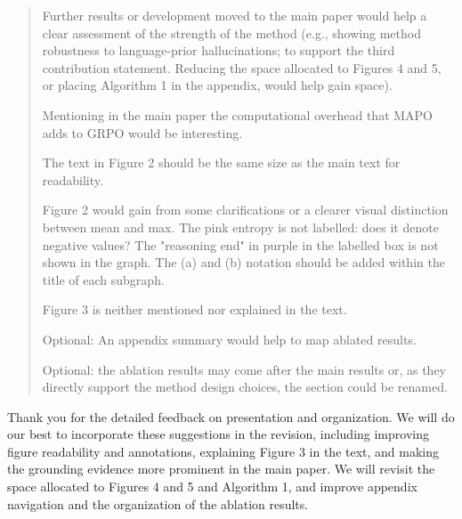 \begin{quote}\small\color{ReviewQuote}
Further results or development moved to the main paper would help a clear assessment of the strength of the method (e.g., showing method robustness to language-prior hallucinations; to support the third contribution statement. Reducing the space allocated to Figures 4 and 5, or placing Algorithm 1 in the appendix, would help gain space).

Mentioning in the main paper the computational overhead that MAPO adds to GRPO would be interesting.

The text in Figure 2 should be the same size as the main text for readability.

Figure 2 would gain from some clarifications or a clearer visual distinction between mean and max. The pink entropy is not labelled: does it denote negative values? The "reasoning end" in purple in the labelled box is not shown in the graph. The (a) and (b) notation should be added within the title of each subgraph.

Figure 3 is neither mentioned nor explained in the text.

Optional: An appendix summary would help to map ablated results.

Optional: the ablation results may come after the main results or, as they directly support the method design choices, the section could be renamed.

\end{quote}

Thank you for the detailed feedback on presentation and organization. We will do our best to incorporate these suggestions in the revision, including improving figure readability and annotations, explaining Figure 3 in the text, and making the grounding evidence more prominent in the main paper. We will revisit the space allocated to Figures 4 and 5 and Algorithm 1, and improve appendix navigation and the organization of the ablation results.
